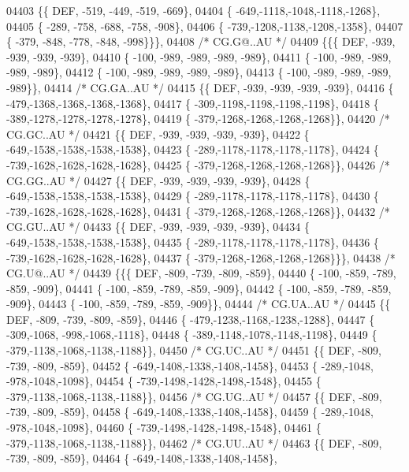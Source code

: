\begin{DoxyCode}
04403 \{\{  DEF, -519, -449, -519, -669\},
04404 \{ -649,-1118,-1048,-1118,-1268\},
04405 \{ -289, -758, -688, -758, -908\},
04406 \{ -739,-1208,-1138,-1208,-1358\},
04407 \{ -379, -848, -778, -848, -998\}\}\},
04408 \textcolor{comment}{/* CG.G@..AU */}
04409 \{\{\{  DEF, -939, -939, -939, -939\},
04410 \{ -100, -989, -989, -989, -989\},
04411 \{ -100, -989, -989, -989, -989\},
04412 \{ -100, -989, -989, -989, -989\},
04413 \{ -100, -989, -989, -989, -989\}\},
04414 \textcolor{comment}{/* CG.GA..AU */}
04415 \{\{  DEF, -939, -939, -939, -939\},
04416 \{ -479,-1368,-1368,-1368,-1368\},
04417 \{ -309,-1198,-1198,-1198,-1198\},
04418 \{ -389,-1278,-1278,-1278,-1278\},
04419 \{ -379,-1268,-1268,-1268,-1268\}\},
04420 \textcolor{comment}{/* CG.GC..AU */}
04421 \{\{  DEF, -939, -939, -939, -939\},
04422 \{ -649,-1538,-1538,-1538,-1538\},
04423 \{ -289,-1178,-1178,-1178,-1178\},
04424 \{ -739,-1628,-1628,-1628,-1628\},
04425 \{ -379,-1268,-1268,-1268,-1268\}\},
04426 \textcolor{comment}{/* CG.GG..AU */}
04427 \{\{  DEF, -939, -939, -939, -939\},
04428 \{ -649,-1538,-1538,-1538,-1538\},
04429 \{ -289,-1178,-1178,-1178,-1178\},
04430 \{ -739,-1628,-1628,-1628,-1628\},
04431 \{ -379,-1268,-1268,-1268,-1268\}\},
04432 \textcolor{comment}{/* CG.GU..AU */}
04433 \{\{  DEF, -939, -939, -939, -939\},
04434 \{ -649,-1538,-1538,-1538,-1538\},
04435 \{ -289,-1178,-1178,-1178,-1178\},
04436 \{ -739,-1628,-1628,-1628,-1628\},
04437 \{ -379,-1268,-1268,-1268,-1268\}\}\},
04438 \textcolor{comment}{/* CG.U@..AU */}
04439 \{\{\{  DEF, -809, -739, -809, -859\},
04440 \{ -100, -859, -789, -859, -909\},
04441 \{ -100, -859, -789, -859, -909\},
04442 \{ -100, -859, -789, -859, -909\},
04443 \{ -100, -859, -789, -859, -909\}\},
04444 \textcolor{comment}{/* CG.UA..AU */}
04445 \{\{  DEF, -809, -739, -809, -859\},
04446 \{ -479,-1238,-1168,-1238,-1288\},
04447 \{ -309,-1068, -998,-1068,-1118\},
04448 \{ -389,-1148,-1078,-1148,-1198\},
04449 \{ -379,-1138,-1068,-1138,-1188\}\},
04450 \textcolor{comment}{/* CG.UC..AU */}
04451 \{\{  DEF, -809, -739, -809, -859\},
04452 \{ -649,-1408,-1338,-1408,-1458\},
04453 \{ -289,-1048, -978,-1048,-1098\},
04454 \{ -739,-1498,-1428,-1498,-1548\},
04455 \{ -379,-1138,-1068,-1138,-1188\}\},
04456 \textcolor{comment}{/* CG.UG..AU */}
04457 \{\{  DEF, -809, -739, -809, -859\},
04458 \{ -649,-1408,-1338,-1408,-1458\},
04459 \{ -289,-1048, -978,-1048,-1098\},
04460 \{ -739,-1498,-1428,-1498,-1548\},
04461 \{ -379,-1138,-1068,-1138,-1188\}\},
04462 \textcolor{comment}{/* CG.UU..AU */}
04463 \{\{  DEF, -809, -739, -809, -859\},
04464 \{ -649,-1408,-1338,-1408,-1458\},

\end{DoxyCode}
